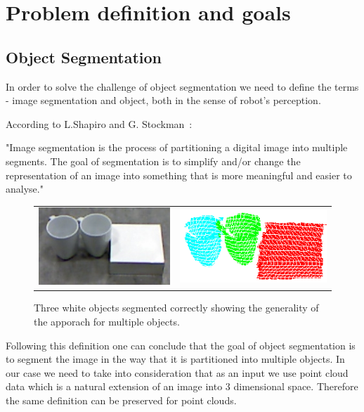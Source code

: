 \section{Problem definition and goals}

\subsection{Object Segmentation} 

In order to solve the challenge of object segmentation we need to define the terms - image segmentation and object, both in the sense of robot's perception. 


According to L.Shapiro and G. Stockman~\cite{shapiro2001computer}:

\noindent "Image segmentation is the process of partitioning a digital image into multiple segments. The goal of segmentation is to simplify and/or change the representation of an image into something that is more meaningful and easier to analyse."

\begin{figure}[ht]
\begin{tabular}{cccc}

\multicolumn{2}{c}{\includegraphics[width=0.45\columnwidth]{figures/3objects/after_push.jpg}}
& \multicolumn{2}{c}{\includegraphics[width=0.45\columnwidth]{figures/3objects/segmented.png}}

\end{tabular}
\caption{Three white objects segmented correctly showing the generality of the apporach for multiple objects.}
\label{fig:three_objects}
\end{figure}


 Following this definition one can conclude that the goal of object segmentation is to segment the image in the way that it is partitioned into multiple objects. In our case we need to take into consideration that as an input we use point cloud data which is a natural extension of an image into 3 dimensional space. Therefore the same definition can be preserved for point clouds. 

